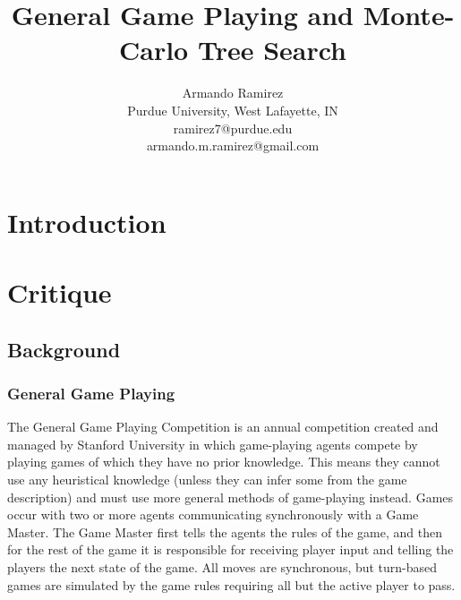 \documentclass[letterpaper]{article}
\title{General Game Playing and Monte-Carlo Tree Search}
\author{Armando Ramirez \\ Purdue University, West Lafayette, IN \\ ramirez7@purdue.edu \\ armando.m.ramirez@gmail.com}
\begin{document}
\maketitle

\section{Introduction}
\section{Critique}

\subsection{Background}

\subsubsection{General Game Playing}
The General Game Playing Competition is an annual competition created and managed by Stanford University in which game-playing agents compete by playing games of which they have no prior knowledge.\cite{StanfordGGP} This means they cannot use any heuristical knowledge (unless they can infer some from the game description) and must use more general methods of game-playing instead. Games occur with two or more agents communicating synchronously with a Game Master. The Game Master first tells the agents the rules of the game, and then for the rest of the game it is responsible for receiving player input and telling the players the next state of the game. All moves are synchronous, but turn-based games are simulated by the game rules requiring all but the active player to pass.
\end{document}
